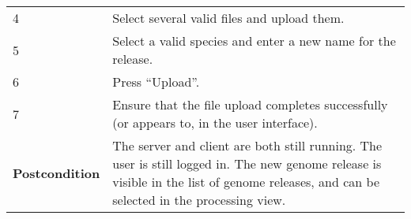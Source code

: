 \begin{longtable}[c]{@{}ll@{}}
\begin{minipage}[t]{0.31\columnwidth}\raggedright\strut
4
\strut\end{minipage} &
\begin{minipage}[t]{0.63\columnwidth}\raggedright\strut
Select several valid files and upload them.
\strut\end{minipage}\tabularnewline
\begin{minipage}[t]{0.31\columnwidth}\raggedright\strut
5
\strut\end{minipage} &
\begin{minipage}[t]{0.63\columnwidth}\raggedright\strut
Select a valid species and enter a new name for the release.
\strut\end{minipage}\tabularnewline
\begin{minipage}[t]{0.31\columnwidth}\raggedright\strut
6
\strut\end{minipage} &
\begin{minipage}[t]{0.63\columnwidth}\raggedright\strut
Press ``Upload''.
\strut\end{minipage}\tabularnewline
\begin{minipage}[t]{0.31\columnwidth}\raggedright\strut
7
\strut\end{minipage} &
\begin{minipage}[t]{0.63\columnwidth}\raggedright\strut
Ensure that the file upload completes successfully (or appears to, in
the user interface).
\strut\end{minipage}\tabularnewline
\begin{minipage}[t]{0.31\columnwidth}\raggedright\strut
\textbf{Postcondition}
\strut\end{minipage} &
\begin{minipage}[t]{0.63\columnwidth}\raggedright\strut
The server and client are both still running. The user is still logged
in. The new genome release is visible in the list of genome releases,
and can be selected in the processing view.
\strut\end{minipage}\tabularnewline
\bottomrule
\end{longtable}

